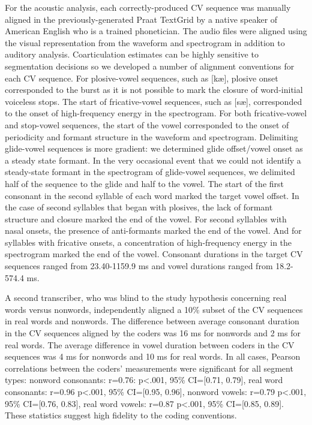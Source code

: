 \documentclass[a4paper,man,natbib,donotrepeattitle, apacite]{apa6}
\begin{document}
For the acoustic analysis, each correctly-produced CV sequence was manually aligned in the previously-generated Praat TextGrid \cite{boersmaPraatDoingPhonetics2018} by a native speaker of American English who is a trained phonetician. The audio files were aligned using the visual representation from the waveform and spectrogram in addition to auditory analysis. Coarticulation estimates can be highly sensitive to segmentation decisions so we developed a number of alignment conventions for each CV sequence. For plosive-vowel sequences, such as [k\ae], plosive onset corresponded to the burst as it is not possible to mark the closure of word-initial voiceless stops. The start of fricative-vowel sequences, such as [s\ae], corresponded to the onset of high-frequency energy in the spectrogram. For both fricative-vowel and stop-vowel sequences, the start of the vowel corresponded to the onset of periodicity and formant structure in the waveform and spectrogram. Delimiting glide-vowel sequences is more gradient: we determined glide offset/vowel onset as a steady state formant. In the very occasional event that we could not identify a steady-state formant in the spectrogram of glide-vowel sequences, we delimited half of the sequence to the glide and half to the vowel. The start of the first consonant in the second syllable of each word marked the target vowel offset. In the case of second syllables that began with plosives, the lack of formant structure and closure marked the end of the vowel. For second syllables with nasal onsets, the presence of anti-formants marked the end of the vowel. And for syllables with fricative onsets, a concentration of high-frequency energy in the spectrogram marked the end of the vowel. Consonant durations in the target CV sequences ranged from 23.40-1159.9 ms and vowel durations ranged from 18.2-574.4 ms.  

A second transcriber, who was blind to the study hypothesis concerning real words versus nonwords, independently aligned a 10\% subset of the CV sequences in real words and nonwords. The difference between average consonant duration in the CV sequences aligned by the coders was 16 ms for nonwords and 2 ms for real words. The average difference in vowel duration between coders in the CV sequences was 4 ms for nonwords and 10 ms for real words. In all cases, Pearson correlations between the coders’ measurements were significant for all segment types: nonword consonants: r=0.76: p<.001, 95\% CI=[0.71, 0.79], real word consonants: r=0.96 p<.001, 95\% CI=[0.95, 0.96], nonword vowels: r=0.79 p<.001, 95\% CI=[0.76, 0.83], real word vowels: r=0.87 p<.001, 95\% CI=[0.85, 0.89]. These statistics suggest high fidelity to the coding conventions. 
\end{document}
